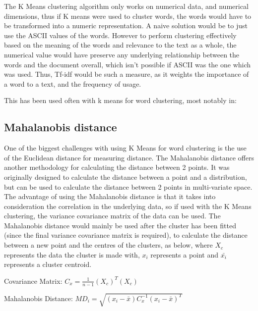 The K Means clustering algorithm only works on numerical data, and numerical dimensions, thus if K means were used to cluster words, the words would have to be transformed into a numeric representation. A naive solution would be to just use the ASCII values of the words. However to perform clustering effectively based on the meaning of the words and relevance to the text as a whole, the numerical value would have preserve any underlying relationship between the words and the document overall, which isn't possible if ASCII was the one which was used. Thus, Tf-idf would be such a measure, as it weights the importance of a word to a text, and the frequency of usage. 

This has been used often with k means for word clustering, most notably in:

\subsection{Mahalanobis distance}
One of the biggest challenges with using K Means for word clustering is the use of the Euclidean distance for measuring distance. The Mahalanobis distance offers another methodology for calculating the distance between 2 points. It was originally designed to calculate the distance between a point and a distribution, but can be used to calculate the distance between 2 points in multi-variate space. The advantage of using the Mahalanobis distance is that it takes into consideration the correlation in the underlying data, so if used with the K Means clustering, the variance covariance matrix of the data can be used. The Mahalanobis distance would mainly be used after the cluster has been fitted (since the final variance covariance matrix is required), to calculate the distance between a new point and the centres of the clusters, as below, where $X_{c}$ represents the data the cluster is made with, $x_{i}$ represents a point and $\bar{x_{i}}$ represents a cluster centroid.  

\begin{center}
	Covariance Matrix:
	$C_{x} = \frac{1}{n - 1} (X_{c}) ^T (X_{c})$
	
	Mahalanobis Distance:
	$MD_{i} = \sqrt{(x_{i}  -  \bar{ x  } ) C_{x}^{-1} ( x_{i}   - \bar{ x  }  )^T    }  $
\end{center}